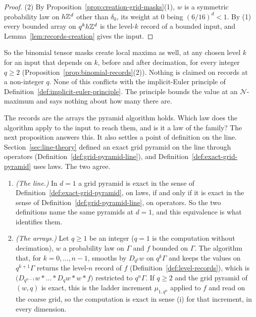 \begin{proof}
(2) By Proposition~\ref{prop:creation-grid-masks}(1), $w$ is a symmetric probability law on
$h\mathbb{Z}^d$ other than $\delta_0$, its weight at $0$ being $(6/16)^d < 1$. By (1) every bounded array
on $q^kh\mathbb{Z}^d$ is the level-$k$ record of a bounded input, and Lemma~\ref{lem:records-creation}
gives the input.
\end{proof}

So the binomial tensor masks create local maxima as well, at any chosen level $k$ for an input
that depends on $k$, before and after decimation, for every integer $q \ge 2$
(Proposition~\ref{prop:binomial-records}(2)). Nothing is claimed on records at a non-integer $q$.
None of this conflicts with the implicit-Euler principle of
Definition~\ref{def:implicit-euler-principle}. The principle bounds the value at an
$\mathcal{N}$-maximum and says nothing about how many there are.

The records are the arrays the pyramid algorithm holds. Which law does the algorithm apply to the
input to reach them, and is it a law of the family? The next proposition answers this. It also
settles a point of definition on the line. Section~\ref{sec:line-theory} defined an exact grid
pyramid on the line through operators (Definition~\ref{def:grid-pyramid-line}), and
Definition~\ref{def:exact-grid-pyramid} uses laws. The two agree.

\begin{proposition}
\label{prop:line-and-arrays}

\begin{enumerate}
\item \emph{(The line.)} In $d = 1$ a grid pyramid is exact in the sense of
Definition~\ref{def:exact-grid-pyramid}, on laws, if and only if it is exact in the sense of
Definition~\ref{def:grid-pyramid-line}, on operators. So the two definitions name the same
pyramids at $d = 1$, and this equivalence is what identifies them.
\item \emph{(The arrays.)} Let $q \ge 1$ be an integer ($q = 1$ is the computation without decimation), $w$ a probability law on $\Gamma$ and $f$
bounded on $\Gamma$. The algorithm that, for $k = 0, \dots, n-1$, smooths by $D_{q^k}w$ on
$q^k\Gamma$ and keeps the values on $q^{k+1}\Gamma$ returns the level-$n$ record of $f$
(Definition~\ref{def:level-records}), which is
$\bigl(D_{q^{n-1}}w * \dots * D_qw * w * f\bigr)$ restricted to $q^n\Gamma$. If $q \ge 2$ and the
grid pyramid of $(w, q)$ is exact, this is the ladder increment $\mu_{1,q^n}$ applied to $f$ and read on the coarse
grid, so the computation is exact in sense (i) for that increment, in every dimension.
\end{enumerate}
\end{proposition}

